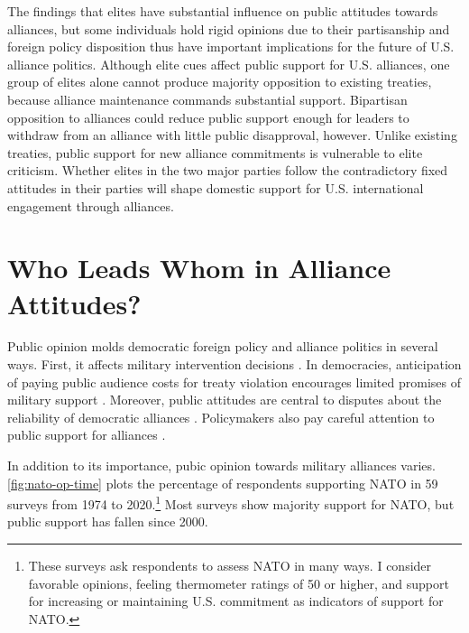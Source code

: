 \documentclass[12pt]{article}
\begin{document}
The findings that elites have substantial influence on public attitudes towards alliances, but some individuals hold rigid opinions due to their partisanship and foreign policy disposition thus have important implications for the future of U.S. alliance politics. 
Although elite cues affect public support for U.S. alliances, one group of elites alone cannot produce majority opposition to existing treaties, because alliance maintenance commands substantial support.
Bipartisan opposition to alliances could reduce public support enough for leaders to withdraw from an alliance with little public disapproval, however.  
Unlike existing treaties, public support for new alliance commitments is vulnerable to elite criticism. 
Whether elites in the two major parties follow the contradictory fixed attitudes in their parties will shape domestic support for U.S. international engagement through alliances.



\section{Who Leads Whom in Alliance Attitudes?}


Public opinion molds democratic foreign policy and alliance politics in several ways.
First, it affects military intervention decisions \citep{Tomzetal2020, LinGreenberg2021}. 
In democracies, anticipation of paying public audience costs for treaty violation encourages limited promises of military support \citep{Chibaetal2015, FjelstulReiter2019}. 
Moreover, public attitudes are central to disputes about the reliability of democratic alliances \citep{Gaubatz1996, GartzkeGleditsch2004}. 
Policymakers also pay careful attention to public support for alliances \citep{Sayle2019}. 


In addition to its importance, pubic opinion towards military alliances varies. 
\autoref{fig:nato-op-time} plots the percentage of respondents supporting NATO in 59 surveys from 1974 to 2020.\footnote{These surveys ask respondents to assess NATO in many ways. I consider favorable opinions, feeling thermometer ratings of 50 or higher, and support for increasing or maintaining U.S. commitment as indicators of support for NATO.} 
Most surveys show majority support for NATO, but public support has fallen since 2000.  
\end{document}
